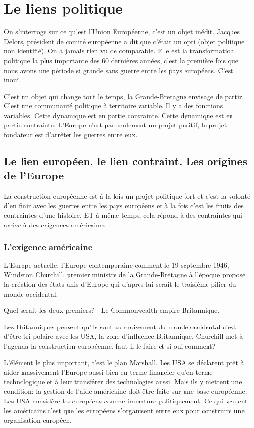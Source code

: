 \chapter{Le liens politique}

On s'interroge sur ce qu'est l'Union Européenne, c'est un objet inédit. Jacques Delors, président de comité européenne a dit que c'était un opti (objet politique non identifié). On a jamais rien vu de comparable. Elle est la transformation politique la plus importante des 60 dernières années, c'est la première fois que nous avons une période si grande sans guerre entre les pays européens. C'est inouï.

C'est un objet qui change tout le temps, la Grande-Bretagne envisage de partir. C'est une communauté politique à territoire variable. Il y a des fonctions variables. Cette dynamique est en partie contrainte. Cette dynamique est en partie contrainte. L'Europe n'est pas seulement un projet positif, le projet fondateur est d'arrêter les guerres entre eux. 

\section{Le lien européen, le lien contraint. Les origines de l'Europe}

La construction européenne est à la fois un projet politique fort et c'est la volonté d'en finir avec les guerres entre les pays européens et à la fois c'est les fruits des contraintes d'une histoire. ET à même temps, cela répond à des contraintes qui arrive à des exigences américaines.

\subsection{L'exigence américaine} 

L'Europe actuelle, l'Europe contemporaine comment le 19 septembre 1946, Windston Churchill, premier ministre de la Grande-Bretagne à l'époque propose la création des états-unis d'Europe qui d'après lui serait le troisième pilier du monde occidental.

Quel serait les deux premiers? 
-	Le Commonwealth empire Britannique.

Les Britanniques pensent qu'ils sont au croisement du monde occidental c'est d'être tri polaire avec les USA, la zone d'influence Britannique. Churchill met à l'agenda la construction européenne, faut-il le faire et si oui comment? 

L'élément le plus important, c'est le plan Marshall. Les USA se déclarent prêt à aider massivement l'Europe aussi bien en terme financier qu'en terme technologique et à leur transférer des technologies aussi.
Mais ils y mettent une condition: la gestion de l'aide américaine doit être faite sur une base européenne.  Les USA considère les européens comme immature politiquement. Ce qui veulent les américains c'est que les européens s'organisent entre eux pour construire une organisation européen.

